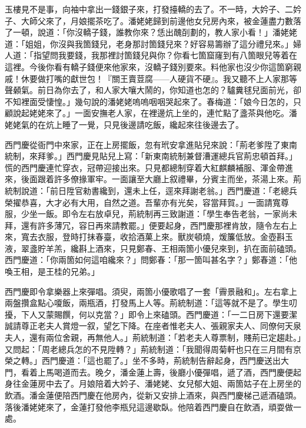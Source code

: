 玉樓見不是事，向袖中拿出一錢銀子來，打發擡轎的去了。不一時，大妗子、二妗子、大師父來了，月娘擺茶吃了。潘姥姥歸到前邊他女兒房內來，被金蓮盡力數落了一頓，說道：「你沒轎子錢，誰教你來？恁出醜㓦劃的，教人家小看！」潘姥姥道：「姐姐，你沒與我箇錢兒，老身那討箇錢兒來？好容易籌辦了這分禮兒來。」婦人道：「指望問我要錢，我那裡討箇錢兒與你？你看七箇窟窿到有八箇眼兒等着在這裡。今後你看有轎子錢便來他家來，沒轎子錢別要來。料他家也沒少你這箇窮親戚！休要做打嘴的獻世包！『關王賣荳腐——人硬貨不硬』。我又聽不上人家那等𣭈聲顙氣。前日為你去了，和人家大嚷大鬧的，{}你知道也怎的？驢糞毬兒面前光，卻不知裡面受悽惶。」幾句說的潘姥姥嗚嗚咽咽哭起來了。春梅道：「娘今日怎的，只顧說起姥姥來了。」一面安撫老人家，在裡邊炕上坐的，連忙點了盞茶與他吃。潘姥姥氣的在炕上睡了一覺，只見後邊請吃飯，纔起來往後邊去了。

西門慶從衙門中來家，正在上房擺飯，忽有玳安拿進貼兒來說：「荊老爹陞了東南統制，來拜爹。」西門慶見貼兒上寫：「新東南統制兼督漕運總兵官荊忠頓首拜。」慌的西門慶連忙穿衣，冠帶迎接出來。只見都總制穿着大紅麒麟補服、渾金帶進來，後面跟着許多僚掾軍牢。一面讓至大廳上叙禮畢，分賓主而坐，茶湯上來。荊統制說道：「前日陞官勑書纔到，還未上任，逕來拜謝老翁。」西門慶道：「老總兵榮擢恭喜，大才必有大用，自然之道。吾輩亦有光矣，容當拜賀。」一面請寬尊服，少坐一飯。即令左右放卓兒，荊統制再三致謝道：「學生奉告老翁，一家尚未拜，還有許多薄冗，容日再來請教罷。」便要起身，西門慶那裡肯放，隨令左右上來，寬去衣服，登時打抹春臺，收拾酒菓上來。獸炭頓燒，煖簾低放。金壺斟玉液，翠盞貯羊羔，纔斟上酒來，只見鄭春、王相兩箇小優兒來到，扒在面前磕頭。西門慶道：「你兩箇如何這咱纔來？」問鄭春：「那一箇叫甚名字？」鄭春道：「他喚王相，是王桂的兄弟。」

西門慶即令拿樂器上來彈唱。須臾，兩箇小優歌唱了一套「霽景融和」。左右拿上兩盤攢盒點心嗄飯，兩瓶酒，打發馬上人等。荊統制道：「這等就不是了。學生叨擾，下人又蒙賜饌，何以克當？」即令上來磕頭。西門慶道：「一二日房下還要潔誠請尊正老夫人賞燈一叙，望乞下降。在座者惟老夫人、張親家夫人、同僚何天泉夫人，還有兩位舍親，再無他人。」荊統制道：「若老夫人尊票制，賤荊已定趨赴。」又問起：「周老總兵怎的不見陞轉？」荊統制道：「我聞得周菊軒也只在三月間有京榮之轉。」西門慶道：「這也罷了。」坐不多時，荊統制告辭起身，西門慶送出大門，看着上馬喝道而去。晚夕，潘金蓮上壽，後廳小優彈唱，遞了酒，西門慶便起身往金蓮房中去了。月娘陪着大妗子、潘姥姥、女兒郁大姐、兩箇姑子在上房坐的飲酒。潘金蓮便陪西門慶在他房內，從新又安排上酒來，與西門慶梯己遞酒磕頭。{}落後潘姥姥來了，金蓮打發他李瓶兒這邊歇臥。他陪着西門慶自在飲酒，頑耍做一處。

